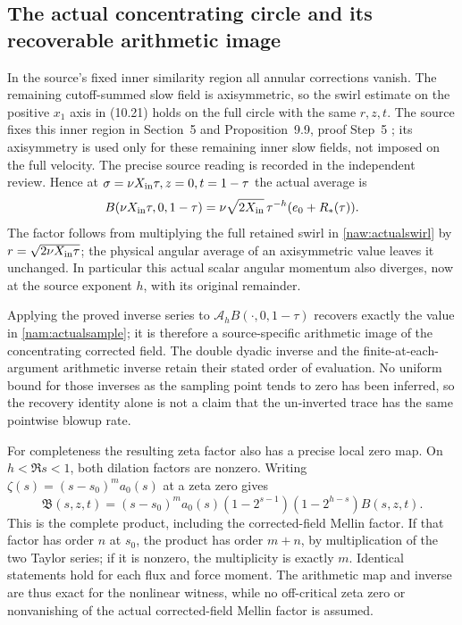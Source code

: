 \subsection{The actual concentrating circle and its recoverable arithmetic image}

In the source's fixed inner similarity region all annular corrections
vanish. The remaining cutoff-summed slow field is axisymmetric, so
the swirl estimate on the positive $x_1$ axis in (10.21) holds on
the full circle with the same $r,z,t$. The source fixes this
inner region in Section~5 and Proposition~9.9, proof Step~5
\cite{openaiNS2026release}; its axisymmetry is used only for these
remaining inner slow fields, not imposed on the full velocity.
The precise source reading is recorded in the independent review.
Hence at
$\sigma=\nu X_{\rm in}\tau,z=0,t=1-\tau$ the actual average is
\begin{equation}
 B(\nu X_{\rm in}\tau,0,1-\tau)
   =\nu\sqrt{2X_{\rm in}}\,\tau^{-h}(e_0+R_*(\tau)).
 \label{nam:actualsample}
\end{equation}
The factor follows from multiplying the full retained swirl in
\eqref{naw:actualswirl} by $r=\sqrt{2\nu X_{\rm in}\tau}$;
the physical angular average of an axisymmetric value leaves it
unchanged. In particular this actual scalar angular momentum also
diverges, now at the source exponent $h$, with its original remainder.

Applying the proved inverse series to
$\mathcal A_hB(\cdot,0,1-\tau)$ recovers exactly the value in
\eqref{nam:actualsample}; it is therefore a source-specific arithmetic
image of the concentrating corrected field. The double dyadic inverse
and the finite-at-each-argument arithmetic inverse retain their stated
order of evaluation. No uniform bound for those inverses as the
sampling point tends to zero has been inferred, so the recovery
identity alone is not a claim that the un-inverted trace has the same
pointwise blowup rate.

For completeness the resulting zeta factor also has a precise local
zero map. On $h<\Re s<1$, both dilation factors are nonzero.
Writing $\zeta(s)=(s-s_0)^m a_0(s)$ at a zeta zero gives
\[
 \mathfrak B(s,z,t)=(s-s_0)^m a_0(s)
       (1-2^{s-1})(1-2^{h-s})\widehat B(s,z,t).
\]
This is the complete product, including the corrected-field Mellin
factor. If that factor has order $n$ at $s_0$, the product has order
$m+n$, by multiplication of the two Taylor series; if it is nonzero,
the multiplicity is exactly $m$. Identical statements hold for each
flux and force moment. The arithmetic map and inverse are thus exact
for the nonlinear witness, while no off-critical zeta zero or
nonvanishing of the actual corrected-field Mellin factor is assumed.
